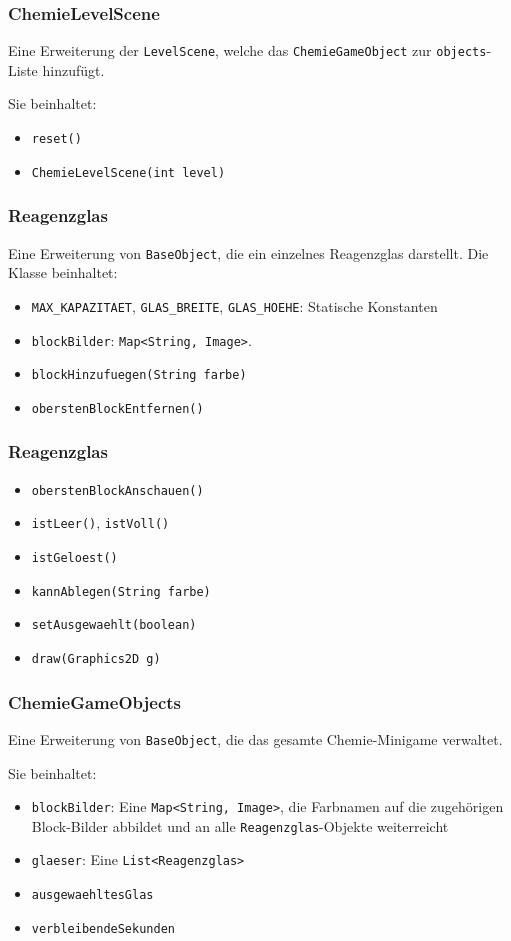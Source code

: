 \begin{frame}
\frametitle{ChemieLevelScene}
Eine Erweiterung der \texttt{LevelScene}, welche das \texttt{ChemieGameObject} zur \texttt{objects}-Liste hinzufügt.

Sie beinhaltet:
	\begin{itemize}
		\item \texttt{reset()}
		\item \texttt{ChemieLevelScene(int level)}
	\end{itemize}
\end{frame}

\begin{frame}
	\frametitle{Reagenzglas}
	Eine Erweiterung von \texttt{BaseObject}, die ein einzelnes Reagenzglas darstellt.
	Die Klasse beinhaltet:
		\begin{itemize}
			\item \texttt{MAX\_KAPAZITAET}, \texttt{GLAS\_BREITE}, \texttt{GLAS\_HOEHE}: Statische Konstanten
			\item \texttt{blockBilder}: \texttt{Map<String, Image>}.
			\item \texttt{blockHinzufuegen(String farbe)}
			\item \texttt{oberstenBlockEntfernen()}
		\end{itemize}
\end{frame}

\begin{frame}
	\frametitle{Reagenzglas}

	\begin{itemize}
		\item \texttt{oberstenBlockAnschauen()}
		\item \texttt{istLeer()}, \texttt{istVoll()}
		\item \texttt{istGeloest()}
		\item \texttt{kannAblegen(String farbe)}
		\item \texttt{setAusgewaehlt(boolean)}
		\item \texttt{draw(Graphics2D g)}
	\end{itemize}
\end{frame}

\begin{frame}
	\frametitle{ChemieGameObjects}
	Eine Erweiterung von \texttt{BaseObject}, die das gesamte Chemie-Minigame verwaltet.

	Sie beinhaltet:
		\begin{itemize}
			\item \texttt{blockBilder}: Eine \texttt{Map<String, Image>}, die Farbnamen auf die zugehörigen Block-Bilder abbildet und an alle \texttt{Reagenzglas}-Objekte weiterreicht
			\item \texttt{glaeser}: Eine \texttt{List<Reagenzglas>}
			\item \texttt{ausgewaehltesGlas}
			\item \texttt{verbleibendeSekunden}
		\end{itemize}
\end{frame}


